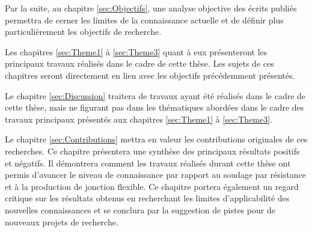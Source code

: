 Par la suite, au chapitre \ref{sec:Objectifs}, une analyse objective des écrits publiés permettra de cerner les limites de la connaissance actuelle et de définir plus particulièrement les objectifs de recherche. 

Les chapitres \ref{sec:Theme1} à \ref{sec:Theme3} quant à eux présenteront les principaux travaux réalisés dans le cadre de cette thèse. 
Les sujets de ces chapitres seront directement en lien avec les objectifs précédemment présentés. 

Le chapitre \ref{sec:Discussion} traitera de travaux ayant été réalisés dans le cadre de cette thèse, mais ne figurant pas dans les thématiques abordées dans le cadre des travaux principaux présentés aux chapitres \ref{sec:Theme1} à \ref{sec:Theme3}.  

Le chapitre \ref{sec:Contributions} mettra en valeur les contributions originales de ces recherches. 
Ce chapitre présentera une synthèse des principaux résultats positifs et négatifs. 
Il démontrera comment les travaux réalisés durant cette thèse ont permis d'avancer le niveau de connaissance par rapport au soudage par résistance et à la production de jonction flexible. 
Ce chapitre portera également un regard critique sur les résultats obtenus en recherchant les limites d'applicabilité des nouvelles connaissances et se conclura par la suggestion de pistes pour de nouveaux projets de recherche. 

